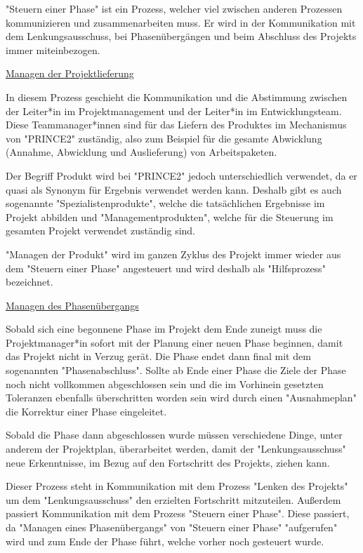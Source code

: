 "Steuern einer Phase" ist ein Prozess, welcher viel zwischen anderen Prozessen kommunizieren und zusammenarbeiten muss. Er wird in der Kommunikation mit dem Lenkungsausschuss, bei Phasenübergängen und beim Abschluss des Projekts immer miteinbezogen. \cite{Prince2}

\underline{Managen der Projektlieferung}

In diesem Prozess geschieht die Kommunikation und die Abstimmung zwischen der Leiter*in im Projektmanagement und der Leiter*in im Entwicklungsteam. Diese Teammanager*innen sind für das Liefern des Produktes im Mechanismus von "PRINCE2" zuständig, also zum Beispiel für die gesamte Abwicklung (Annahme, Abwicklung und Auslieferung) von Arbeitspaketen.

Der Begriff Produkt wird bei "PRINCE2" jedoch unterschiedlich verwendet, da er quasi als Synonym für Ergebnis verwendet werden kann. Deshalb gibt es auch sogenannte "Spezialistenprodukte", welche die tatsächlichen Ergebnisse im Projekt abbilden und "Managementprodukten", welche für die Steuerung im gesamten Projekt verwendet zuständig sind.

"Managen der Produkt" wird im ganzen Zyklus des Projekt immer wieder aus dem "Steuern einer Phase" angesteuert und wird deshalb als "Hilfsprozess" bezeichnet. \cite{Prince2}

\underline{Managen des Phasenübergangs}

Sobald sich eine begonnene Phase im Projekt dem Ende zuneigt muss die Projektmanager*in sofort mit der Planung einer neuen Phase beginnen, damit das Projekt nicht in Verzug gerät. Die Phase endet dann final mit dem sogenannten "Phasenabschluss". Sollte ab Ende einer Phase die Ziele der Phase noch nicht vollkommen abgeschlossen sein und die im Vorhinein gesetzten Toleranzen ebenfalls überschritten worden sein wird durch einen "Ausnahmeplan" die Korrektur einer Phase eingeleitet.

Sobald die Phase dann abgeschlossen wurde müssen verschiedene Dinge, unter anderem der Projektplan, überarbeitet werden, damit der "Lenkungsausschuss" neue Erkenntnisse, im Bezug auf den Fortschritt des Projekts, ziehen kann.

Dieser Prozess steht in Kommunikation mit dem Prozess "Lenken des Projekts" um dem "Lenkungsausschuss" den erzielten Fortschritt mitzuteilen. Außerdem passiert Kommunikation mit dem Prozess "Steuern einer Phase". Diese passiert, da "Managen eines Phasenübergangs" von "Steuern einer Phase" "aufgerufen" wird und zum Ende der Phase führt, welche vorher noch gesteuert wurde. \cite{Prince2}

